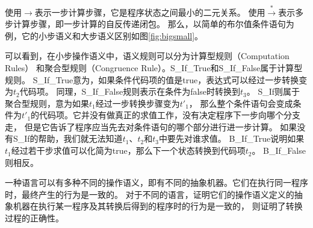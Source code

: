 使用$\rightarrow $表示一步计算步骤，它是程序状态之间最小的二元关系。
使用$\xrightarrow{*} $表示多步计算步骤，即一步计算的自反传递闭包。
那么，以简单的布尔值条件语句为例，它的小步语义和大步语义区别如图\ref{fig:bigsmall}。

可以看到，在小步操作语义中，语义规则可以分为计算型规则（Computation Rules）
和聚合型规则（Congruence Rule）。S\_If\_True和S\_If\_False属于计算型规则。
S\_If\_True意为，如果条件代码项的值是true，表达式可以经过一步转换变为$t_2$代码项。
同理，S\_If\_False规则表示在条件为false时转换到$t_3$。
S\_If则属于聚合型规则，意为如果$t_1$经过一步转换步骤变为$t'_1$，
那么整个条件语句会变成条件为$t'_1$的代码项。它并没有做真正的求值工作，没有决定程序下一步向哪个分支走，
但是它告诉了程序应当先去对条件语句的哪个部分进行进一步计算。
如果没有S\_If的帮助，我们就无法知道$t_1$、$t_2$和$t_3$中要先对谁求值。
B\_If\_True说明如果$t_1$经过若干步求值可以化简为true，那么下一个状态转换到代码项$t_2$。
B\_If\_False则相反。

一种语言可以有多种不同的操作语义，即有不同的抽象机器。它们在执行同一程序时，最终产生的行为是一致的。
对于不同的语言，证明它们的操作语义定义的抽象机器在执行某一程序及其转换后得到的程序时的行为是一致的，
则证明了转换过程的正确性。

